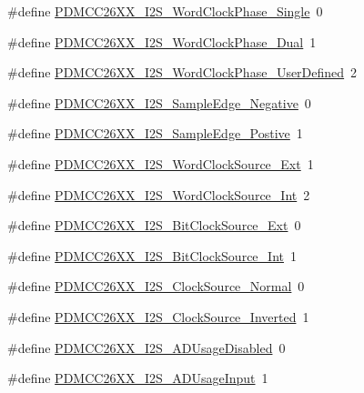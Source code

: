 \begin{DoxyCompactItemize}
\item 
\#define \hyperlink{_p_d_m_c_c26_x_x__util_8h_ad5e97275f3d868adfea67f33b08a2632}{P\+D\+M\+C\+C26\+X\+X\+\_\+\+I2\+S\+\_\+\+Word\+Clock\+Phase\+\_\+\+Single}~0
\item 
\#define \hyperlink{_p_d_m_c_c26_x_x__util_8h_ad37a9ce9685187bfa88526541722cdaa}{P\+D\+M\+C\+C26\+X\+X\+\_\+\+I2\+S\+\_\+\+Word\+Clock\+Phase\+\_\+\+Dual}~1
\item 
\#define \hyperlink{_p_d_m_c_c26_x_x__util_8h_a96543fc7fe2422e8680c4aae87abdd48}{P\+D\+M\+C\+C26\+X\+X\+\_\+\+I2\+S\+\_\+\+Word\+Clock\+Phase\+\_\+\+User\+Defined}~2
\item 
\#define \hyperlink{_p_d_m_c_c26_x_x__util_8h_a34160fd5f1a971d556156570afc26e44}{P\+D\+M\+C\+C26\+X\+X\+\_\+\+I2\+S\+\_\+\+Sample\+Edge\+\_\+\+Negative}~0
\item 
\#define \hyperlink{_p_d_m_c_c26_x_x__util_8h_a287270844da242b7f70ae66ec92c71db}{P\+D\+M\+C\+C26\+X\+X\+\_\+\+I2\+S\+\_\+\+Sample\+Edge\+\_\+\+Postive}~1
\item 
\#define \hyperlink{_p_d_m_c_c26_x_x__util_8h_a6500f8c6c4855330299d5c260f67b6f3}{P\+D\+M\+C\+C26\+X\+X\+\_\+\+I2\+S\+\_\+\+Word\+Clock\+Source\+\_\+\+Ext}~1
\item 
\#define \hyperlink{_p_d_m_c_c26_x_x__util_8h_acebf97118ebc531d62b9b632548f4404}{P\+D\+M\+C\+C26\+X\+X\+\_\+\+I2\+S\+\_\+\+Word\+Clock\+Source\+\_\+\+Int}~2
\item 
\#define \hyperlink{_p_d_m_c_c26_x_x__util_8h_ab679cdfce2dc3c8f8a17b69d96f5b178}{P\+D\+M\+C\+C26\+X\+X\+\_\+\+I2\+S\+\_\+\+Bit\+Clock\+Source\+\_\+\+Ext}~0
\item 
\#define \hyperlink{_p_d_m_c_c26_x_x__util_8h_a0657ed74629a0b3d5a00e7caad959f11}{P\+D\+M\+C\+C26\+X\+X\+\_\+\+I2\+S\+\_\+\+Bit\+Clock\+Source\+\_\+\+Int}~1
\item 
\#define \hyperlink{_p_d_m_c_c26_x_x__util_8h_aa98a64d9ee07d7978624379de0b79083}{P\+D\+M\+C\+C26\+X\+X\+\_\+\+I2\+S\+\_\+\+Clock\+Source\+\_\+\+Normal}~0
\item 
\#define \hyperlink{_p_d_m_c_c26_x_x__util_8h_a34a2318316066a045683f98694180d25}{P\+D\+M\+C\+C26\+X\+X\+\_\+\+I2\+S\+\_\+\+Clock\+Source\+\_\+\+Inverted}~1
\item 
\#define \hyperlink{_p_d_m_c_c26_x_x__util_8h_a7a06ccb33b16d28d7d38570e90db4145}{P\+D\+M\+C\+C26\+X\+X\+\_\+\+I2\+S\+\_\+\+A\+D\+Usage\+Disabled}~0
\item 
\#define \hyperlink{_p_d_m_c_c26_x_x__util_8h_af1aad8fceab94ec0db069110420bec38}{P\+D\+M\+C\+C26\+X\+X\+\_\+\+I2\+S\+\_\+\+A\+D\+Usage\+Input}~1

\end{DoxyCompactItemize}

